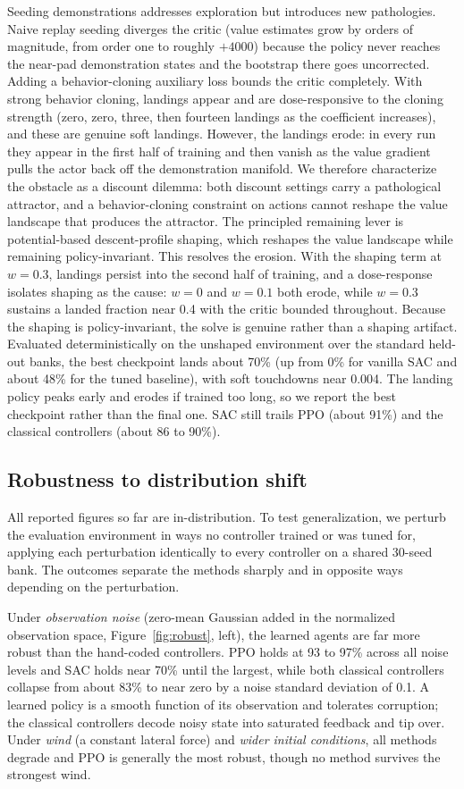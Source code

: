 \documentclass[10pt,twocolumn]{article}
\begin{document}
Seeding demonstrations addresses exploration but introduces new pathologies. Naive replay seeding diverges the critic (value estimates grow by orders of magnitude, from order one to roughly $+4000$) because the policy never reaches the near-pad demonstration states and the bootstrap there goes uncorrected. Adding a behavior-cloning auxiliary loss bounds the critic completely. With strong behavior cloning, landings appear and are dose-responsive to the cloning strength (zero, zero, three, then fourteen landings as the coefficient increases), and these are genuine soft landings. However, the landings erode: in every run they appear in the first half of training and then vanish as the value gradient pulls the actor back off the demonstration manifold. We therefore characterize the obstacle as a discount dilemma: both discount settings carry a pathological attractor, and a behavior-cloning constraint on actions cannot reshape the value landscape that produces the attractor. The principled remaining lever is potential-based descent-profile shaping, which reshapes the value landscape while remaining policy-invariant. This resolves the erosion. With the shaping term at $w=0.3$, landings persist into the second half of training, and a dose-response isolates shaping as the cause: $w=0$ and $w=0.1$ both erode, while $w=0.3$ sustains a landed fraction near 0.4 with the critic bounded throughout. Because the shaping is policy-invariant, the solve is genuine rather than a shaping artifact. Evaluated deterministically on the unshaped environment over the standard held-out banks, the best checkpoint lands about 70\% (up from 0\% for vanilla SAC and about 48\% for the tuned baseline), with soft touchdowns near 0.004. The landing policy peaks early and erodes if trained too long, so we report the best checkpoint rather than the final one. SAC still trails PPO (about 91\%) and the classical controllers (about 86 to 90\%).

\subsection{Robustness to distribution shift}
\label{sec:robust}
All reported figures so far are in-distribution. To test generalization, we perturb the evaluation environment in ways no controller trained or was tuned for, applying each perturbation identically to every controller on a shared 30-seed bank. The outcomes separate the methods sharply and in opposite ways depending on the perturbation.

Under \emph{observation noise} (zero-mean Gaussian added in the normalized observation space, Figure~\ref{fig:robust}, left), the learned agents are far more robust than the hand-coded controllers. PPO holds at 93 to 97\% across all noise levels and SAC holds near 70\% until the largest, while both classical controllers collapse from about 83\% to near zero by a noise standard deviation of 0.1. A learned policy is a smooth function of its observation and tolerates corruption; the classical controllers decode noisy state into saturated feedback and tip over. Under \emph{wind} (a constant lateral force) and \emph{wider initial conditions}, all methods degrade and PPO is generally the most robust, though no method survives the strongest wind.
\end{document}
